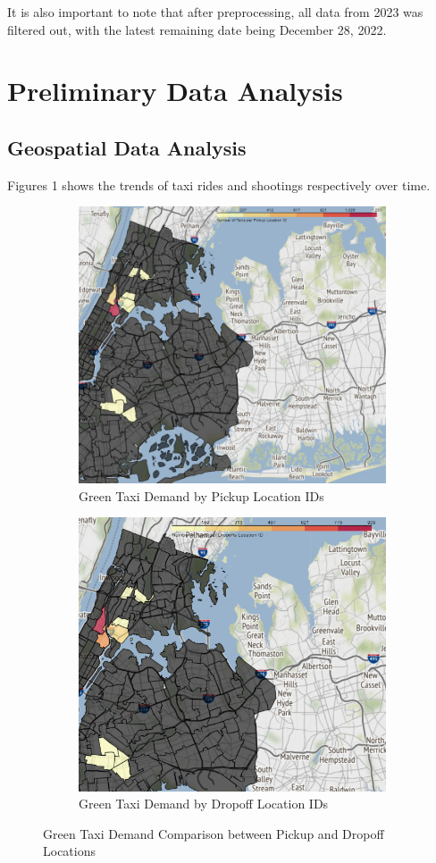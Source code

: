 \documentclass[11pt]{article}
\begin{document}
It is also important to note that after preprocessing, all data from 2023 was filtered out, with the latest remaining date being December 28, 2022.
 
\section{Preliminary Data Analysis}
\subsection{Geospatial Data Analysis}
Figures 1 shows the trends of taxi rides and shootings respectively over time.

\begin{figure}[h]
    \begin{subfigure}{0.5\textwidth}
        \centering
        \includegraphics[width=0.8\linewidth]{plots/map_taxi_pickups.png}
        \caption{Green Taxi Demand by Pickup Location IDs}
    \end{subfigure}%
    \begin{subfigure}{0.5\textwidth}
        \centering
        \includegraphics[width=0.8\linewidth]{plots/map_taxi_dropoffs.png}
        \caption{Green Taxi Demand by Dropoff Location IDs}
    \end{subfigure}
    \caption{Green Taxi Demand Comparison between Pickup and Dropoff Locations}
\end{figure} 
\end{document}
